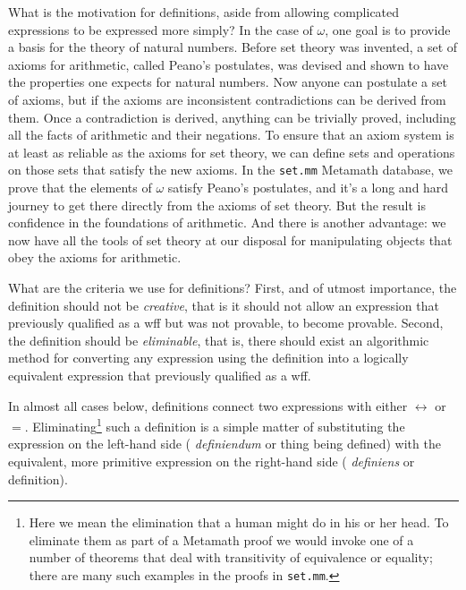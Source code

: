 What is the motivation for definitions, aside from allowing complicated
expressions to be expressed more simply?  In the case of  $\omega$, one goal is
to provide a basis for the theory of natural numbers.
Before set theory was invented, a set of axioms for arithmetic, called Peano's
postulates, was devised and shown to have the
properties one expects for natural numbers.  Now anyone can postulate a
set of axioms, but if the axioms are inconsistent contradictions can be derived
from them.  Once a contradiction is derived, anything can be trivially
proved, including
all the facts of arithmetic and their negations.  To ensure that an
axiom system is at least as reliable as the axioms for set theory, we can
define sets and operations on those sets that satisfy the new axioms. In the
\texttt{set.mm} Metamath database, we prove that the elements of $\omega$ satisfy
Peano's postulates, and it's a long and hard journey to get there directly
from the axioms of set theory.  But the result is confidence in the
foundations of arithmetic.  And there is another advantage:  we now have all
the tools of set theory at our disposal for manipulating objects that obey the
axioms for arithmetic.

What are the criteria we use for definitions?  First, and of utmost importance,
the definition should not be {\em creative}, that
is it should not allow an expression that previously qualified as a wff but
was not provable, to become provable.   Second, the definition should be {\em
eliminable}, that is, there should exist an
algorithmic method for converting any expression using the definition into
a logically equivalent expression that previously qualified as a wff.

In almost all cases below, definitions connect two expressions with either
$\leftrightarrow$ or $=$.  Eliminating\footnote{Here we mean the
elimination that a human might do in his or her head.  To eliminate them as
part of a Metamath proof we would invoke one of a number of
theorems that deal with transitivity of equivalence or equality; there are
many such examples in the proofs in \texttt{set.mm}.} such a definition is a
simple matter of substituting the expression on the left-hand side ({\em
definiendum} or thing being defined) with the equivalent,
more primitive expression on the right-hand side ({\em
definiens} or definition).

